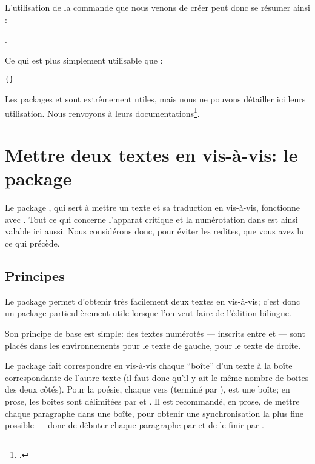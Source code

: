  L'utilisation de la commande que nous venons de créer peut donc se résumer ainsi : 
 
 . 
 
Ce qui est  plus simplement utilisable que :

\verb|{|\verb|}|

\begin{plusloins}
Les packages  et  sont extrêmement utiles, mais nous ne pouvons détailler ici leurs utilisation. Nous renvoyons à leurs documentations\footcites{ifthen}{xargs}.
\end{plusloins}





 






\section{Mettre deux textes en vis-à-vis: le package }


Le package , qui sert à mettre un texte et sa traduction en vis-à-vis, fonctionne avec . Tout ce qui concerne l'apparat critique et la numérotation dans  est ainsi valable ici aussi. Nous considérons donc, pour éviter les redites, que vous avez lu ce qui précède.



\subsection{Principes}

Le package  permet d'obtenir très facilement deux textes en vis-à-vis; c'est donc un package particulièrement utile lorsque l'on veut faire de l'édition bilingue.

Son principe de base est simple:  des textes numérotés  --- inscrits entre  et   --- sont placés dans les environnements  pour le texte de gauche,   pour le texte de droite.

Le package  fait correspondre en vis-à-vis chaque \enquote{boîte} d'un texte à la boîte correspondante de l'autre texte (il faut donc qu'il y ait le même nombre de boites des deux côtés). Pour la poésie,  chaque vers  (terminé par \ampersand ), est une boîte;  en prose, les boîtes sont délimitées par   et  .  Il est recommandé, en prose, de mettre chaque paragraphe dans une boîte, pour obtenir une synchronisation la plus fine possible --- donc de débuter chaque paragraphe par  et de le finir par . 


